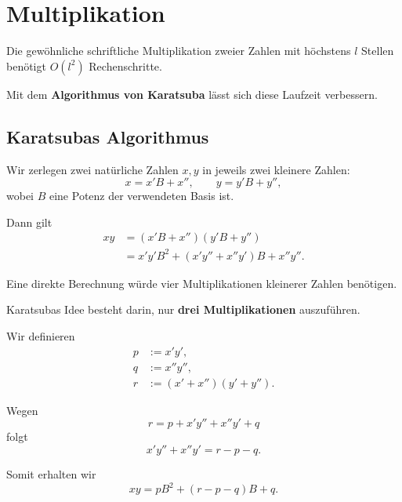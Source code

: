 \section{Multiplikation}

Die gewöhnliche schriftliche Multiplikation
zweier Zahlen mit höchstens $l$ Stellen
benötigt $O(l^2)$ Rechenschritte.

Mit dem \textbf{Algorithmus von Karatsuba}
lässt sich diese Laufzeit verbessern.

\subsection{Karatsubas Algorithmus}

Wir zerlegen zwei natürliche Zahlen $x,y$
in jeweils zwei kleinere Zahlen:
\[
  x=x'B+x'',
  \qquad
  y=y'B+y'',
\]
wobei $B$ eine Potenz der verwendeten Basis ist.

Dann gilt
\begin{align*}
  xy
  &=(x'B+x'')(y'B+y'')\\
  &=x'y'B^2+(x'y''+x''y')B+x''y''.
\end{align*}

Eine direkte Berechnung würde vier
Multiplikationen kleinerer Zahlen benötigen.

Karatsubas Idee besteht darin, nur
\textbf{drei Multiplikationen} auszuführen.

Wir definieren
\begin{align*}
  p&:=x'y',\\
  q&:=x''y'',\\
  r&:=(x'+x'')(y'+y'').
\end{align*}

Wegen
\[
  r=p+x'y''+x''y'+q
\]
folgt
\[
  x'y''+x''y'=r-p-q.
\]

Somit erhalten wir
\[
  \boxed{
    xy=pB^2+(r-p-q)B+q.
  }
\]




